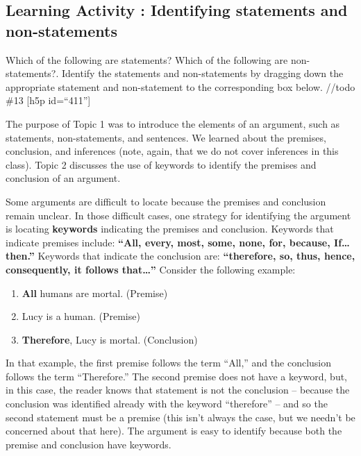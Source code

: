 \documentclass[
]{book}
\providecommand{\tightlist}{%
  \setlength{\itemsep}{0pt}\setlength{\parskip}{0pt}}
\begin{document}
\hypertarget{learning-activity-identifying-statements-and-non-statements}{%
\subsection*{Learning Activity : Identifying statements and non-statements}\label{learning-activity-identifying-statements-and-non-statements}}

Which of the following are statements? Which of the following are non-statements?. Identify the statements and non-statements by dragging down the appropriate statement and non-statement to the corresponding box below.
//todo \#13
{[}h5p id=``411''{]}

The purpose of Topic 1 was to introduce the elements of an argument, such as statements, non-statements, and sentences. We learned about the premises, conclusion, and inferences (note, again, that we do not cover inferences in this class). Topic 2 discusses the use of keywords to identify the premises and conclusion of an argument.

Some arguments are difficult to locate because the premises and conclusion remain unclear. In those difficult cases, one strategy for identifying the argument is locating \textbf{keywords} indicating the premises and conclusion. Keywords that indicate premises include: \textbf{``All, every, most, some, none, for, because, If\ldots then.''} Keywords that indicate the conclusion are: \textbf{``therefore, so, thus, hence, consequently, it follows that\ldots{}''} Consider the following example:

\begin{enumerate}
\def\labelenumi{\arabic{enumi}.}
\tightlist
\item
  \textbf{All} humans are mortal. (Premise)
\item
  Lucy is a human. (Premise)
\item
  \textbf{Therefore}, Lucy is mortal. (Conclusion)
\end{enumerate}

In that example, the first premise follows the term ``All,'' and the conclusion follows the term ``Therefore.'' The second premise does not have a keyword, but, in this case, the reader knows that statement is not the conclusion -- because the conclusion was identified already with the keyword ``therefore'' -- and so the second statement must be a premise (this isn't always the case, but we needn't be concerned about that here). The argument is easy to identify because both the premise and conclusion have keywords.
\end{document}
